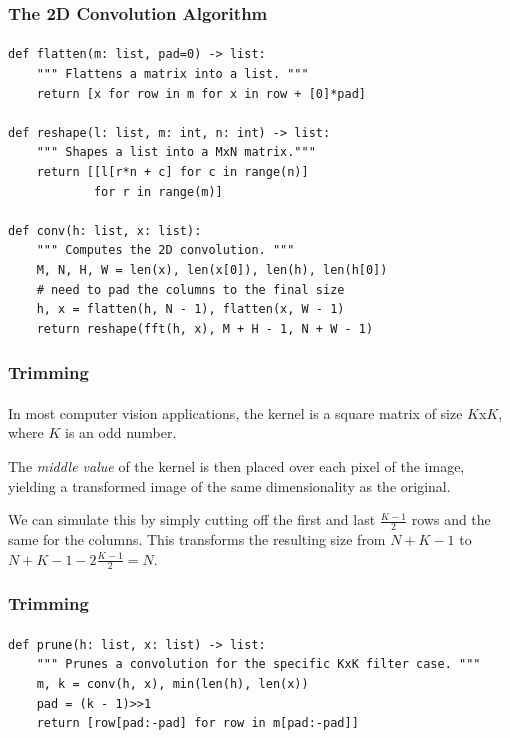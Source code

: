 \documentclass{beamer}                             %
\begin{document}
\begin{frame}[fragile]
\frametitle{The 2D Convolution Algorithm}
\framesubtitle{}
\begin{verbatim}
def flatten(m: list, pad=0) -> list:
    """ Flattens a matrix into a list. """
    return [x for row in m for x in row + [0]*pad]

def reshape(l: list, m: int, n: int) -> list:
    """ Shapes a list into a MxN matrix."""
    return [[l[r*n + c] for c in range(n)]
            for r in range(m)]

def conv(h: list, x: list):
    """ Computes the 2D convolution. """
    M, N, H, W = len(x), len(x[0]), len(h), len(h[0])
    # need to pad the columns to the final size
    h, x = flatten(h, N - 1), flatten(x, W - 1)
    return reshape(fft(h, x), M + H - 1, N + W - 1)
\end{verbatim}
\end{frame}

\begin{frame}
\frametitle{Trimming}
\framesubtitle{}
In most computer vision applications, the kernel is a square matrix
of size \( K \)x\( K \), where \( K \) is an odd number. \pause

The \textit{middle value} of the kernel is then placed over each pixel of the
image, yielding a transformed image of the same dimensionality as the original.
\pause

We can simulate this by simply cutting off the first and last
\( \frac{K - 1}{2} \) rows and the same for the columns.
This transforms the resulting size from \( N + K - 1 \) to
\( N + K - 1 - 2 \frac{K - 1}{2} = N \).
\end{frame}

\begin{frame}[fragile]
\frametitle{Trimming}
\framesubtitle{}
\begin{verbatim}
def prune(h: list, x: list) -> list:
    """ Prunes a convolution for the specific KxK filter case. """
    m, k = conv(h, x), min(len(h), len(x))
    pad = (k - 1)>>1
    return [row[pad:-pad] for row in m[pad:-pad]]
\end{verbatim}
\end{frame}
\end{document}
